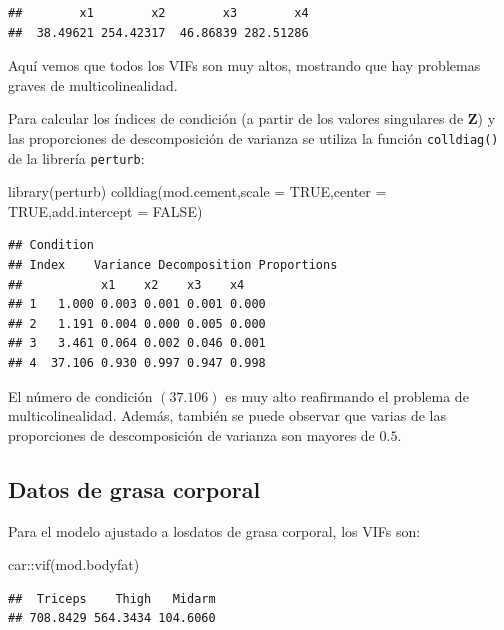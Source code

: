 \documentclass[
]{article}
\newenvironment{Shaded}{\begin{snugshade}}{\end{snugshade}}
\newcommand{\AttributeTok}[1]{\textcolor[rgb]{0.77,0.63,0.00}{#1}}
\newcommand{\ConstantTok}[1]{\textcolor[rgb]{0.00,0.00,0.00}{#1}}
\newcommand{\FunctionTok}[1]{\textcolor[rgb]{0.00,0.00,0.00}{#1}}
\newcommand{\NormalTok}[1]{#1}
\newcommand{\SpecialCharTok}[1]{\textcolor[rgb]{0.00,0.00,0.00}{#1}}
\begin{document}
\begin{verbatim}
##        x1        x2        x3        x4 
##  38.49621 254.42317  46.86839 282.51286
\end{verbatim}

Aquí vemos que todos los VIFs son muy altos, mostrando que hay problemas graves de multicolinealidad.

Para calcular los índices de condición (a partir de los valores singulares de \(\boldsymbol Z\)) y las proporciones de descomposición de varianza se utiliza la función \texttt{colldiag()} de la librería \texttt{perturb}:

\begin{Shaded}
\begin{Highlighting}[]
\FunctionTok{library}\NormalTok{(perturb)}
\FunctionTok{colldiag}\NormalTok{(mod.cement,}\AttributeTok{scale =} \ConstantTok{TRUE}\NormalTok{,}\AttributeTok{center =} \ConstantTok{TRUE}\NormalTok{,}\AttributeTok{add.intercept =} \ConstantTok{FALSE}\NormalTok{)}
\end{Highlighting}
\end{Shaded}

\begin{verbatim}
## Condition
## Index    Variance Decomposition Proportions
##           x1    x2    x3    x4   
## 1   1.000 0.003 0.001 0.001 0.000
## 2   1.191 0.004 0.000 0.005 0.000
## 3   3.461 0.064 0.002 0.046 0.001
## 4  37.106 0.930 0.997 0.947 0.998
\end{verbatim}

El número de condición \((37.106)\) es muy alto reafirmando el problema de multicolinealidad. Además, también se puede observar que varias de las proporciones de descomposición de varianza son mayores de \(0.5\).

\hypertarget{datos-de-grasa-corporal}{%
\subsection{Datos de grasa corporal}\label{datos-de-grasa-corporal}}

Para el modelo ajustado a losdatos de grasa corporal, los VIFs son:

\begin{Shaded}
\begin{Highlighting}[]
\NormalTok{car}\SpecialCharTok{::}\FunctionTok{vif}\NormalTok{(mod.bodyfat)}
\end{Highlighting}
\end{Shaded}

\begin{verbatim}
##  Triceps    Thigh   Midarm 
## 708.8429 564.3434 104.6060
\end{verbatim}
\end{document}

